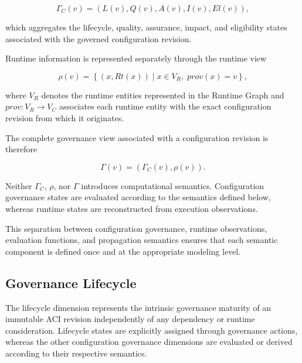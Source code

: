 \documentclass[10pt]{article}
\begin{document}
\begin{equation}
	\Gamma_C(v)=
	\left(
	L(v),
	Q(v),
	A(v),
	I(v),
	El(v)
	\right),
	\label{eq:configuration_governance_descriptor}
\end{equation}

which aggregates the lifecycle, quality, assurance, impact, and eligibility states associated with the governed configuration revision.

Runtime information is represented separately through the runtime view

\begin{equation}
	\rho(v)
	=
	\left\{
	(x,Rt(x))
	\mid
	x\in V_R,\;
	prov(x)=v
	\right\},
	\label{eq:runtime_view}
\end{equation}


where $V_R$ denotes the runtime entities represented in the Runtime Graph and $prov:V_R\rightarrow V_C$ associates each runtime entity with the exact configuration revision from which it originates.

The complete governance view associated with a configuration revision is therefore

\begin{equation}
	\Gamma(v)
	=
	\left(
	\Gamma_C(v),
	\rho(v)
	\right).
	\label{eq:complete_governance_descriptor}
\end{equation}


Neither $\Gamma_C$, $\rho$, nor $\Gamma$ introduces computational semantics. Configuration governance states are evaluated according to the semantics defined below, whereas runtime states are reconstructed from execution observations.

This separation between configuration governance, runtime observations, evaluation functions, and propagation semantics ensures that each semantic component is defined once and at the appropriate modeling level.

\subsection{Governance Lifecycle}
\label{sec:lifecycle_semantics}

The lifecycle dimension represents the intrinsic governance maturity of an immutable ACI revision independently of any dependency or runtime consideration. Lifecycle states are explicitly assigned through governance actions, whereas the other configuration governance dimensions are evaluated or derived according to their respective semantics.
\end{document}
